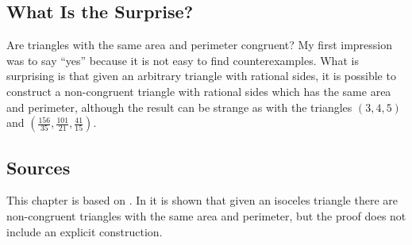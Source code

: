\vspace{-4ex}

\subsection*{What Is the Surprise?}

Are triangles with the same area and perimeter congruent? My first impression was to say ``yes'' because it is not easy to find counterexamples. What is surprising is that given an arbitrary triangle with rational sides, it is possible to construct a non-congruent triangle with rational sides which has the same area and perimeter, although the result can be strange as with the triangles $(3,4,5)$ and $\left(\frac{156}{35}, \frac{101}{21}, \frac{41}{15}\right)$.

\vspace{-2ex}

\subsection*{Sources}

This chapter is based on \cite{mccallum}. In \cite{marita} it is shown that given an isoceles triangle there are non-congruent triangles with the same area and perimeter, but the proof does not include an explicit construction.
